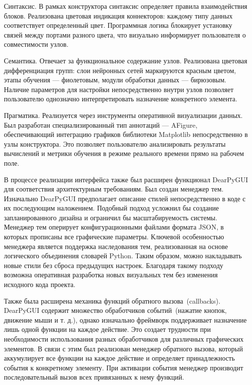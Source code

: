 \documentclass{report}
\begin{document}
\begin{enumarabic}
\item Синтаксис. В рамках конструктора синтаксис определяет правила взаимодействия блоков. Реализована цветовая индикация коннекторов: каждому типу данных соответствует определенный цвет. Программная логика блокирует установку связей между портами разного цвета, что визуально информирует пользователя о совместимости узлов.
\item Семантика. Отвечает за функциональное содержание узлов. Реализована цветовая дифференциация групп: слои нейронных сетей маркируются красным цветом, этапы обучения — фиолетовым, модули обработки данных — бирюзовым. Наличие параметров для настройки непосредственно внутри узлов позволяет пользователю однозначно интерпретировать назначение конкретного элемента.
\item Прагматика. Реализуется через инструменты оперативной визуализации данных. Был разработан специализированный тип аннотаций — AFigure, обеспечивающий интеграцию графиков библиотеки Matplotlib непосредственно в узлы конструктора. Это позволяет пользователю анализировать результаты вычислений и метрики обучения в режиме реального времени прямо на рабочем поле.
\end{enumarabic}


В процессе реализации интерфейса также был расширен функционал DearPyGUI для соответствия архитектурным требованиям. Был создан менеджер тем. Изначально DearPyGUI предполагает описание стилей непосредственно в коде с их последующим наложением. Подобный подход усложнил бы создание запланированного дизайна и ограничил бы масштабируемость системы. Менеджер тем оперирует конфигурационными файлами формата JSON, в которых прописаны все графические параметры. Ключевой особенностью менеджера является поддержка наследования тем, реализованная на основе логического объединения словарей Python. Таким образом, можно накладывать новые стили без сброса предыдущих настроек. Благодаря такому подходу возможна оперативная разработка новых визуальных тем без изменения исходного кода проекта.

Также была расширена механика функций обратного вызова~(callbacks). DearPyGUI содержит множество обработчиков событий~(нажатие кнопок, движение мыши и т. д.), однако изначально фреймворк поддерживает назначение лишь одной функции на каждое действие. Это создает трудности при необходимости использования разных обработчиков для различных графических элементов. В связи с этим был реализован менеджер обратного вызова, который аккумулирует все функции на каждое действие и определяет принадлежность события к конкретному элементу. При активации события менеджер производит последовательный вызов всех привязанных к нему функций.
\end{document}
